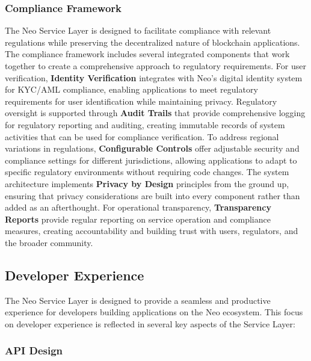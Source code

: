 \documentclass{article}
\begin{document}
\subsubsection{Compliance Framework}
\label{subsubsec:compliance-framework}

The Neo Service Layer is designed to facilitate compliance with relevant regulations while preserving the decentralized nature of blockchain applications. The compliance framework includes several integrated components that work together to create a comprehensive approach to regulatory requirements. For user verification, \textbf{Identity Verification} integrates with Neo's digital identity system for KYC/AML compliance, enabling applications to meet regulatory requirements for user identification while maintaining privacy. Regulatory oversight is supported through \textbf{Audit Trails} that provide comprehensive logging for regulatory reporting and auditing, creating immutable records of system activities that can be used for compliance verification. To address regional variations in regulations, \textbf{Configurable Controls} offer adjustable security and compliance settings for different jurisdictions, allowing applications to adapt to specific regulatory environments without requiring code changes. The system architecture implements \textbf{Privacy by Design} principles from the ground up, ensuring that privacy considerations are built into every component rather than added as an afterthought. For operational transparency, \textbf{Transparency Reports} provide regular reporting on service operation and compliance measures, creating accountability and building trust with users, regulators, and the broader community.

\subsection{Developer Experience}
\label{subsec:nsl-developer}

The Neo Service Layer is designed to provide a seamless and productive experience for developers building applications on the Neo ecosystem. This focus on developer experience is reflected in several key aspects of the Service Layer:

\subsubsection{API Design}
\label{subsubsec:api-design}
\end{document}
